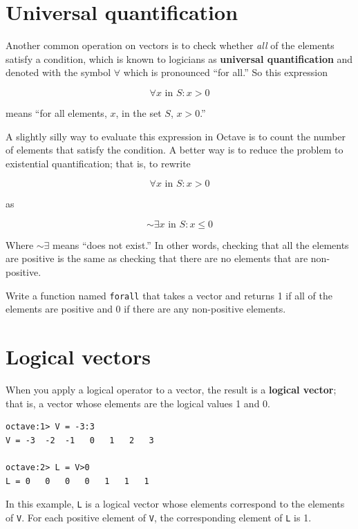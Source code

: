 \documentclass{book}
\begin{document}
\section{Universal quantification}

Another common operation on vectors is to check whether {\em all}
of the elements satisfy a condition, which is known to
logicians as {\bf universal quantification} and denoted with
the symbol $\forall$ which is pronounced ``for all.'' So this
expression

\[ \forall x \mbox{~in~} S: x>0 \]

means ``for all elements, $x$, in the set $S$, $x>0$.''

A slightly silly way to evaluate this expression in Octave is to
count the number of elements that satisfy the condition.
A better way is to reduce the problem to
existential quantification; that is, to rewrite

\[ \forall x \mbox{~in~} S: x>0 \]

as

\[ \sim \exists x \mbox{~in~} S: x \le 0 \]

Where $\sim \exists$ means ``does not exist.''
In other words, checking that all the elements are positive is
the same as checking that there are no elements 
that are non-positive.

\begin{ex}
Write a function named {\tt forall} that
takes a vector and returns 1 if all of the elements are positive
and 0 if there are any non-positive elements.
\end{ex}




\section{Logical vectors}

When you apply a logical operator to a vector, the result is a {\bf
logical vector}; that is, a vector whose elements are the logical
values 1 and 0.

\begin{verbatim}
octave:1> V = -3:3
V = -3  -2  -1   0   1   2   3

octave:2> L = V>0
L = 0   0   0   0   1   1   1
\end{verbatim}

In this example, {\tt L} is a logical vector whose elements
correspond to the elements of {\tt V}. For each positive element of
{\tt V}, the corresponding element of {\tt L} is 1.
\end{document}
